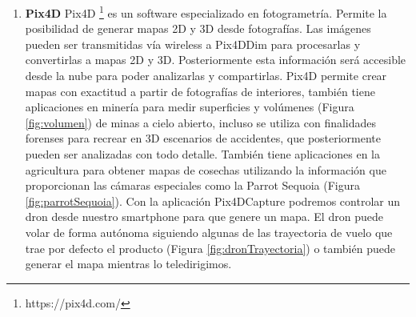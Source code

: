 \begin {enumerate}


\item \textbf{Pix4D}
Pix4D \footnote{https://pix4d.com/} es un software especializado en fotogrametría. Permite la posibilidad de generar mapas 2D y 3D desde fotografías. Las imágenes pueden ser transmitidas vía wireless a Pix4DDim para procesarlas y convertirlas a mapas 2D y 3D.  Posteriormente esta información será accesible desde la nube para poder analizarlas y compartirlas.
Pix4D permite crear mapas con exactitud a partir de fotografías de interiores, también tiene aplicaciones en minería para medir superficies y volúmenes (Figura \ref{fig:volumen}) de minas a cielo abierto, incluso se utiliza con finalidades forenses para recrear en 3D escenarios de accidentes, que posteriormente pueden ser analizadas con todo detalle.
También tiene aplicaciones en la agricultura para obtener mapas de cosechas utilizando la información que proporcionan las cámaras especiales como la Parrot Sequoia (Figura \ref{fig:parrotSequoia}).
Con la aplicación Pix4DCapture podremos controlar un dron desde nuestro smartphone para que genere un mapa. El dron puede volar de forma autónoma siguiendo algunas de las trayectoria de vuelo que trae por defecto el producto (Figura \ref{fig:dronTrayectoria}) o también puede generar el mapa mientras lo teledirigimos.


\end{enumerate}
